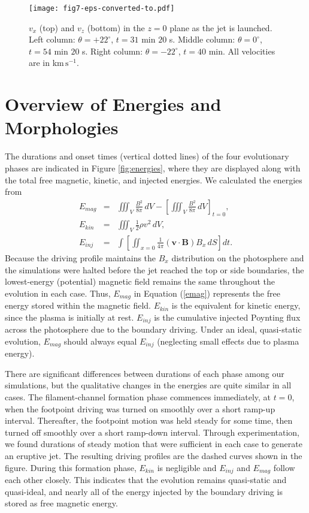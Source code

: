 \documentclass[twocolumn]{aastex6}
\begin{document}
\begin{figure*}
\centering
\texttt{[image: fig7-eps-converted-to.pdf]}
\caption{$v_{x}$ (top) and $v_{z}$ (bottom) in the $z=0$ plane as the jet is launched. Left column: $\theta = +22^\circ$, $t = 31$ min $20$ s. Middle column: $\theta = 0^\circ$, $t = 54$ min $20$ s. Right column: $\theta = -22^\circ$, $t = 40$ min. All velocities are in km$\,\text{s}^{-1}$.}
\label{fig:velcuts}
\end{figure*}

\section{Overview of Energies and Morphologies}
\label{sec:overview}
The durations and onset times (vertical dotted lines) of the four evolutionary phases are indicated in Figure \ref{fig:energies}, where they are displayed along with the total free magnetic, kinetic, and injected energies. We calculated the energies from 
\begin{eqnarray}
E_{mag} &=& \iiint_V \frac{B^{2}}{8\pi} \,dV - \left[ \iiint_V \frac{B^{2}}{8\pi} \,dV \right]_{t=0}, \label{emag}\\
E_{kin} &=& \iiint_{V} \frac{1}{2}\rho v^2 \,dV, \label{ekin}\\
E_{inj} &=& \int{\left[\iint_{x=0} \frac{1}{4\pi} (\mathbf{v} \cdot \mathbf{B}) B_{x} \,dS \right]dt}. \label{einj}
\end{eqnarray}
Because the driving profile maintains the $B_{x}$ distribution on the photosphere and the simulations were halted before the jet reached the top or side boundaries, the lowest-energy (potential) magnetic field remains the same throughout the evolution in each case. Thus, $E_{mag}$ in Equation (\ref{emag}) represents the free energy stored within the magnetic field. $E_{kin}$ is the equivalent for kinetic energy, since the plasma is initially at rest. $E_{inj}$ is the cumulative injected Poynting flux across the photosphere due to the boundary driving. Under an ideal, quasi-static evolution, $E_{mag}$ should always equal $E_{inj}$ (neglecting small effects due to plasma energy).

There are significant differences between durations of each phase among our simulations, but the qualitative changes in the energies are quite similar in all cases. The filament-channel formation phase commences immediately, at $t = 0$, when the footpoint driving was turned on smoothly over a short ramp-up interval. Thereafter, the footpoint motion was held steady for some time, then turned off smoothly over a short ramp-down interval. Through experimentation, we found durations of steady motion that were sufficient in each case to generate an eruptive jet. The resulting driving profiles are the dashed curves shown in the figure. During this formation phase, $E_{kin}$ is negligible and $E_{inj}$ and $E_{mag}$ follow each other closely. This indicates that the evolution remains quasi-static and quasi-ideal, and nearly all of the energy injected by the boundary driving is stored as free magnetic energy.
\end{document}

